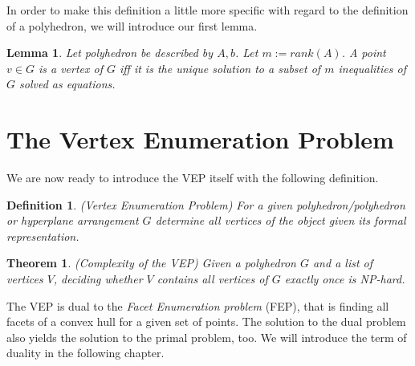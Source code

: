 \documentclass[a4paper, 11pt]{article}
\newtheorem{mydef}{Definition}
\newtheorem{lemma}{Lemma}
\newtheorem{theorem}{Theorem}
\begin{document}
In order to make this definition a little more specific with regard to the definition of a polyhedron, we will introduce our first lemma.

\begin{lemma}\label{corollary1}\cite{introtoAlg}\medskip
	Let polyhedron be described by $A,b$. Let $m:=rank(A)$.\medskip
	A point $v\in G$ is a \textit{vertex} of $G$ iff it is the unique solution to a subset of $m$ inequalities of $G$ solved as equations. 
\end{lemma}

\section{The Vertex Enumeration Problem}
We are now ready to introduce the VEP itself with the following definition.
\begin{mydef}(Vertex Enumeration Problem)\medskip
	For a given polyhedron/polyhedron or hyperplane arrangement $G$ determine all vertices of the object given its formal representation. 
\end{mydef}

\begin{theorem}(Complexity of the VEP)\medskip
	Given a polyhedron $G$ and a list of vertices $V$, deciding whether $V$ contains all vertices of $G$ exactly once is NP-hard.\cite{Khachiyan}
\end{theorem}

The VEP is dual to the \textit{Facet Enumeration problem} (FEP), that is finding all facets of a convex hull for a given set of points. The solution to the dual problem also yields the solution to the primal problem, too. We will introduce the term of duality in the following chapter.\medskip
\end{document}
